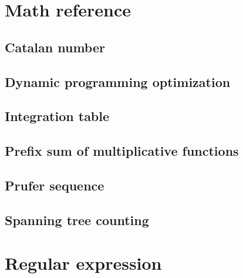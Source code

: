 \documentclass[UTF8,a4paper]{report}
\begin{document}
		\section{Math reference}
			\subsection{Catalan number}
				
			\subsection{Dynamic programming optimization}
				
			\subsection{Integration table}
				
			\subsection{Prefix sum of multiplicative functions}
				
			\subsection{Prufer sequence}
				
			\subsection{Spanning tree counting}
				
		\section{Regular expression}
				
			
\end{document}
